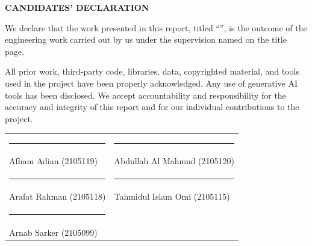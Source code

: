 \begin{center}
  {\Large\bfseries CANDIDATES' DECLARATION}
\end{center}

\vspace{20pt}
We declare that the work presented in this report, titled
``\ProjectTitle'', is the outcome of the engineering work carried out by us
under the supervision named on the title page.

All prior work, third-party code, libraries, data, copyrighted material, and
tools used in the project have been properly acknowledged. Any use of
generative AI tools has been disclosed. We accept accountability and
responsibility for the accuracy and integrity of this report and for our
individual contributions to the project.

\vspace{15mm}
\begin{tabular}{>{\raggedright\arraybackslash}p{} >{\raggedright\arraybackslash}p{}}
  \rule{0.4\textwidth}{0.4pt} & \rule{0.4\textwidth}{0.4pt} \\
  Afham Adian (2105119) & Abdullah Al Mahmud (2105120) \\[15mm]
  \rule{0.4\textwidth}{0.4pt} & \rule{0.4\textwidth}{0.4pt} \\
  Arafat Rahman (2105118) & Tahmidul Islam Omi (2105115) \\[15mm]
  \rule{0.4\textwidth}{0.4pt} & \\
  Arnab Sarker (2105099) &
\end{tabular}
\clearpage
